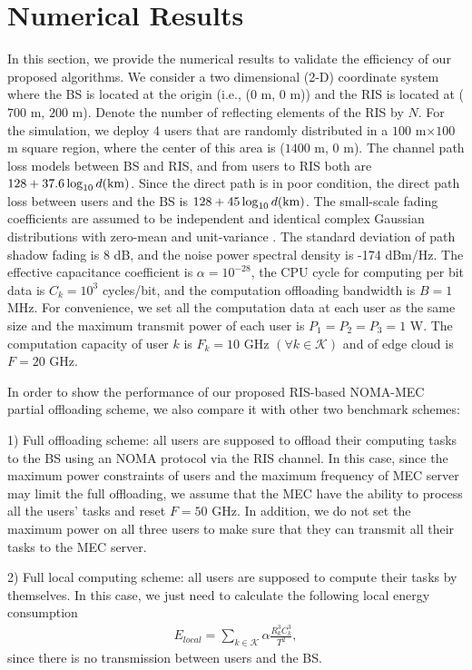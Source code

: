 \documentclass[journal]{IEEEtran}
\begin{document}
\section{Numerical Results}
{In this section, we provide the numerical results to validate the efficiency of our proposed algorithms. We consider a two dimensional (2-D) coordinate system where the BS is located at the origin (i.e., (0 m, 0 m)) and the RIS is located at ($700$ m, $200$ m). Denote the number of reflecting elements of the RIS by $N$. For the simulation, we deploy 4 users that are randomly distributed in a $100$ m$\times100$ m square region, where the center of this area is ($1400$ m, $0$ m). The channel path loss models between BS and RIS, and from users to RIS both are $128+37.6\log_{10} d(\rm{km})$. Since the direct path is in poor condition, the direct path loss between users and the BS is $128+45\log_{10} d(\rm{km})$. The small-scale fading coefficients are assumed to be independent and identical complex Gaussian distributions with zero-mean and unit-variance \cite{chen2019FLwireless}.}
The standard deviation of path shadow fading is 8 dB, and the noise power spectral density is -174 dBm/Hz. The effective capacitance coefficient is $\alpha=10^{-28}$, the CPU cycle for computing per bit data is $C_k=10^3$ cycles/bit, and the computation offloading bandwidth is $B=1$ MHz. For convenience, we set all the computation data at each user as the same size and the maximum transmit power of each user is $P_1=P_2=P_3=1$ W. The computation capacity of user $k$ is  $F_{k}=10$ GHz $(\forall k\in\mathcal K )$  and of edge cloud is $F=20$ GHz.

In order to show the performance of our proposed RIS-based NOMA-MEC partial offloading scheme, we also compare it with other two benchmark schemes:

1) Full offloading scheme: all users are supposed to offload their computing tasks to the BS using an NOMA protocol via the RIS channel. In this case, since the maximum power constraints of users and the maximum frequency of MEC server may limit the full offloading, we assume that the MEC have the ability to process all the users' tasks and reset $F= 50$ GHz. In addition, we do not set the maximum power on all three users to make sure that they can transmit all their tasks to the MEC server.

2) Full local computing scheme: all users are supposed to compute their tasks by themselves. In this case, we just need to calculate the following local energy consumption
\begin{align}
E_{local}=\sum_{k\in\mathcal K}\alpha\frac{R_{k}^3 C^3_{k}}{T^2},
\end{align}
since there is no transmission between users and the BS.
\end{document}
